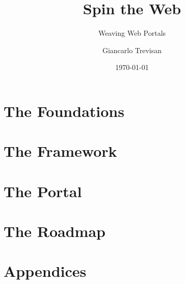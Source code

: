 \documentclass[11pt,openright,twoside,a4paper]{book}
\title{Spin the Web}
\subtitle{Weaving Web Portals}
\author{Giancarlo Trevisan}
\date{\today}
\begin{document}
\frontmatter






\setcounter{tocdepth}{0}
\tableofcontents

\mainmatter

\part{The Foundations}






\part{The Framework}









\part{The Portal}




\part{The Roadmap}



\part*{Appendices}
\appendix




\backmatter
\nocite{*}


\glsaddall
\printglossary
\printindex
\end{document}
